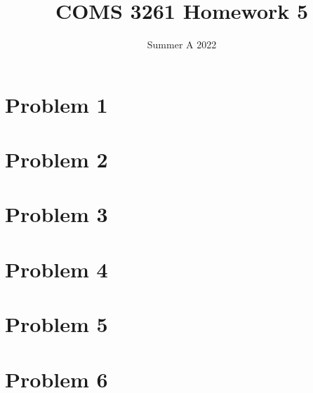 \documentclass{../homework_template}
\title{COMS 3261 Homework 5}
\date{Summer A 2022}
\begin{document}
\maketitle
{}

\newpage
\section{Problem 1}


\newpage
\section{Problem 2}


\newpage
\section{Problem 3}


\newpage
\section{Problem 4}


\newpage
\section{Problem 5}


\newpage
\section{Problem 6}

\end{document}
